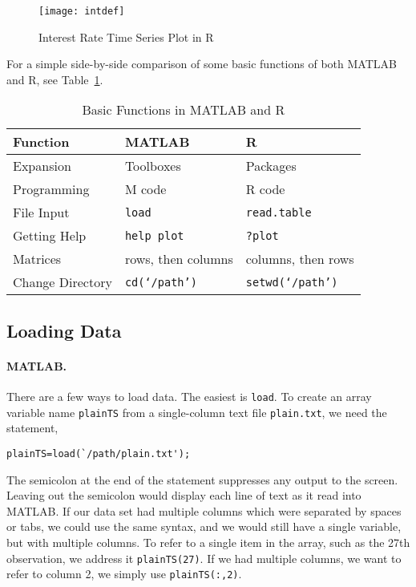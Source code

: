 \begin{figure}[t]
  \centering
  \texttt{[image: intdef]}
  \caption{Interest Rate Time Series Plot in R}
  \label{figure:intdef}
\end{figure}

For a simple side-by-side comparison of some basic functions of both MATLAB and R, see Table~\ref{tab:matlab-r-funcs}.
\begin{table}[htbp]
	\centering
	\begin{tabular}{lll}
	\toprule
	Function & MATLAB & R \\
	\hline
	Expansion & Toolboxes & Packages \\
	Programming & M code & R code \\
	File Input & \texttt{load} & \texttt{read.table} \\
	Getting Help & \texttt{help plot} & \texttt{?plot} \\
	Matrices & rows, then columns & columns, then rows \\
	Change Directory & \texttt{cd(`/path')} & \texttt{setwd(`/path')} \\
	\bottomrule
	\end{tabular}
	\caption{Basic Functions in MATLAB and R}
	\label{tab:matlab-r-funcs}
\end{table}

\subsection{Loading Data}
\paragraph{MATLAB.} There are a few ways to load data. The easiest is \texttt{load}. To create an array variable name \texttt{plainTS} from a single-column text file \texttt{plain.txt}, we need the statement,
\begin{verbatim}
plainTS=load(`/path/plain.txt');
\end{verbatim}

The semicolon at the end of the statement suppresses any output to the screen. Leaving out the semicolon would display each line of text as it read into MATLAB. If our data set had multiple columns which were separated by spaces or tabs, we could use the same syntax, and we would still have a single variable, but with multiple columns. To refer to a single item in the array, such as the 27th observation, we address it \texttt{plainTS(27)}. If we had multiple columns, we want to refer to column 2, we simply use \texttt{plainTS(:,2)}.

